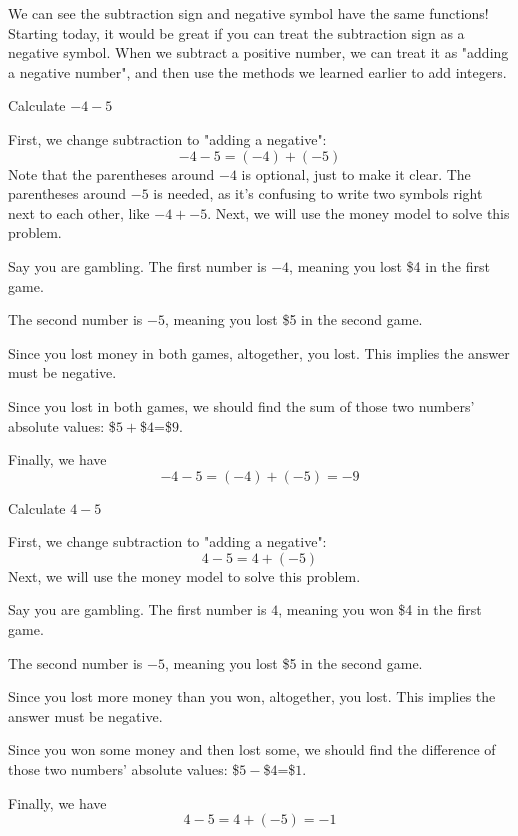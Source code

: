 We can see the subtraction sign and negative symbol have the same functions! Starting today, it would be great if you can treat the subtraction sign as a negative symbol. When we subtract a positive number, we can treat it as "adding a negative number", and then use the methods we learned earlier to add integers.

\begin{myexample}
Calculate $-4-5$
\end{myexample}
\begin{solution}
First, we change subtraction to "adding a negative":
\[ -4-5=(-4)+(-5) \]
Note that the parentheses around $-4$ is optional, just to make it clear. The parentheses around $-5$ is needed, as it's confusing to write two symbols right next to each other, like $-4+-5$.
Next, we will use the money model to solve this problem.
	\begin{steps}
	\item Say you are gambling. The first number is $-4$, meaning you lost \$4 in the first game. 
	\item The second number is $-5$, meaning you lost \$5 in the second game. 
	\item Since you lost money in both games, altogether, you lost. This implies the answer must be negative.
	\item Since you lost in both games, we should find the sum of those two numbers' absolute values: \$$5+$\$$4$=\$$9$.
	\end{steps}
	Finally, we have \[-4-5=(-4)+(-5)=-9\]
\end{solution}

\begin{myexample}
Calculate $4-5$
\end{myexample}
\begin{solution}
First, we change subtraction to "adding a negative":
\[ 4-5=4+(-5) \]
Next, we will use the money model to solve this problem.
	\begin{steps}
	\item Say you are gambling. The first number is $4$, meaning you won \$4 in the first game. 
	\item The second number is $-5$, meaning you lost \$5 in the second game. 
	\item Since you lost more money than you won, altogether, you lost. This implies the answer must be negative.
	\item Since you won some money and then lost some, we should find the difference of those two numbers' absolute values: \$$5-$\$$4$=\$$1$.
	\end{steps}
	Finally, we have \[4-5=4+(-5)=-1\]
\end{solution}

